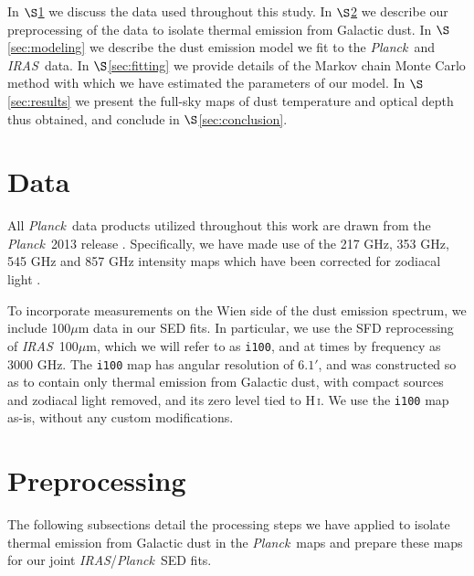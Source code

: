 \documentclass{emulateapj}
\newcommand{\IRAS}{{\it IRAS}}
\newcommand{\PLANCK}{{\it Planck}}
\begin{document}

In $\S$\ref{sec:data} we discuss the data used throughout this study. In 
$\S$\ref{sec:prepro} we describe our preprocessing of the data to isolate 
thermal emission from Galactic dust. In $\S$\ref{sec:modeling} we describe the 
dust emission model we fit to the \PLANCK~and \IRAS~data. In 
$\S$\ref{sec:fitting} we provide details of the Markov chain Monte Carlo method
with which we have estimated the parameters of our model. In 
$\S$\ref{sec:results} we present the full-sky maps of dust temperature and 
optical depth thus obtained, and conclude in $\S$\ref{sec:conclusion}.

 \section{Data}
\label{sec:data}
All \PLANCK~data products utilized throughout this work are drawn from the 
\PLANCK~2013 release \citep{planck2013}. Specifically, we have made use 
of the 217 GHz, 353 GHz, 545 GHz and 857 GHz intensity maps which have been 
corrected for zodiacal light 
\citep[\texttt{R1.10\_nominal\_ZodiCorrected},][]{planckzodi}.

To incorporate measurements on the Wien side of the dust emission spectrum, 
we include 100$\mu$m data in our SED fits. In particular, we use the SFD 
reprocessing of \IRAS~100$\mu$m, which we will refer to as \verb|i100|, and at 
times by frequency as 3000 GHz. The \verb|i100| map has angular resolution of 
$6.1'$, and was constructed so as to contain only thermal 
emission from Galactic dust, with compact sources and zodiacal light removed, 
and its zero level tied to H\,\textsc{i}. We use the \verb|i100| map as-is, without any 
custom modifications.


\section{Preprocessing}
\label{sec:prepro}

The following subsections detail the processing steps we have applied to 
isolate thermal emission from Galactic dust in the \PLANCK~maps and prepare
these maps for our joint \IRAS/\PLANCK~SED fits.
\end{document}
